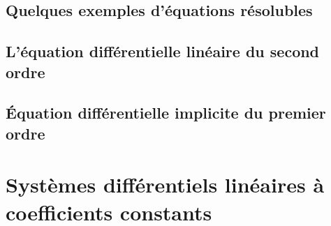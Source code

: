 
					\subsection{Quelques exemples d'équations résolubles}


					\subsection{L'équation différentielle linéaire du second ordre}


					\subsection{Équation différentielle implicite du premier ordre}


					\section{Systèmes différentiels linéaires à coefficients constants}


